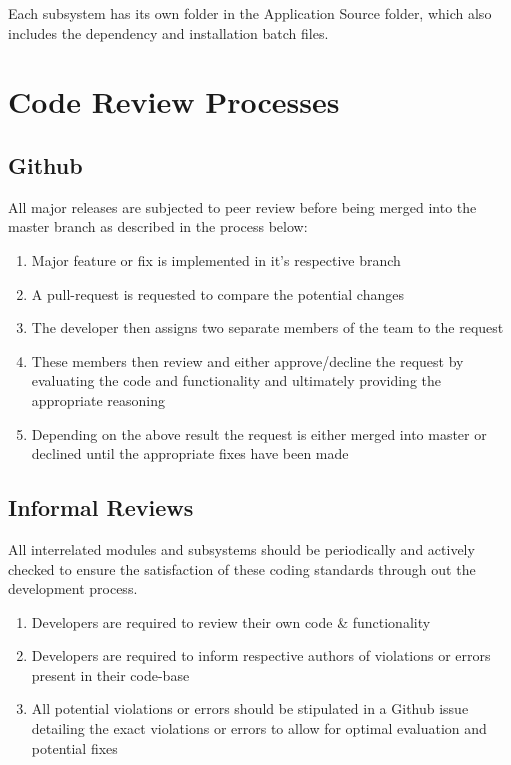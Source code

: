 \documentclass[a4paper, 11pt]{article}
\begin{document}
Each subsystem has its own folder in the Application Source folder, which also includes the dependency and installation batch files.

\pagebreak
\section{Code Review Processes}
\subsection{Github}
All major releases are subjected to peer review before being merged into the master branch as described in the process below:
\begin{enumerate}
    \item Major feature or fix is implemented in it's respective branch
    \item A pull-request is requested to compare the potential changes
    \item The developer then assigns two separate members of the team to the request
    \item These members then review and either approve/decline the request by evaluating the code and functionality and ultimately providing the appropriate reasoning
    \item Depending on the above result the request is either merged into master or declined until the appropriate fixes have been made
\end{enumerate}

\subsection{Informal Reviews}
All interrelated modules and subsystems should be periodically and actively checked to ensure the satisfaction of these coding standards through out the development process.
\begin{enumerate}
    \item Developers are required to review their own code \& functionality
    \item Developers are required to inform respective authors of violations or errors present in their code-base
    \item All potential violations or errors should be stipulated in a Github issue detailing the exact violations or errors to allow for optimal evaluation and potential fixes
\end{enumerate}
\end{document}
